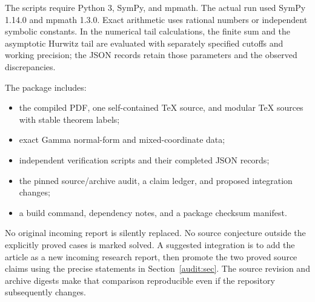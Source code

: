 \documentclass[11pt,a4paper]{article}
\numberwithin{equation}{section}
\theoremstyle{definition}
\theoremstyle{remark}
\begin{document}
The scripts require Python 3, SymPy, and mpmath.  The actual run used
SymPy 1.14.0 and mpmath 1.3.0.  Exact arithmetic uses rational numbers
or independent symbolic constants.  In the numerical tail calculations,
the finite sum and the asymptotic Hurwitz tail are evaluated with
separately specified cutoffs and working precision; the JSON records
retain those parameters and the observed discrepancies.

The package includes:
\begin{itemize}
\item the compiled PDF, one self-contained TeX source, and modular
TeX sources with stable theorem labels;
\item exact Gamma normal-form and mixed-coordinate data;
\item independent verification scripts and their completed JSON records;
\item the pinned source/archive audit, a claim ledger, and proposed
integration changes;
\item a build command, dependency notes, and a package checksum manifest.
\end{itemize}

No original incoming report is silently replaced.  No source conjecture
outside the explicitly proved cases is marked solved.  A suggested
integration is to add the article as a new incoming research report,
then promote the two proved source claims using the precise statements
in Section~\ref{audit:sec}.  The source revision and archive digests
make that comparison reproducible even if the repository subsequently
changes.

\end{document}
